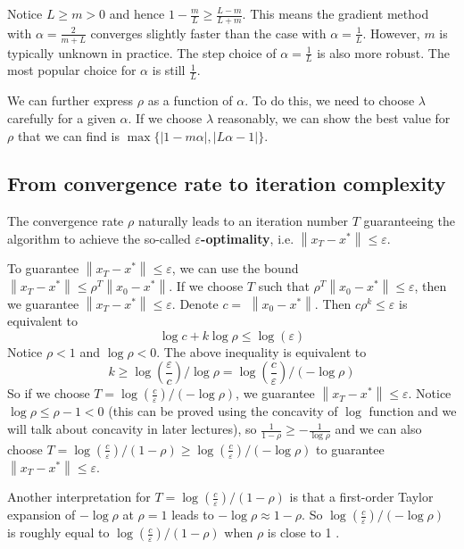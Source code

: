 \documentclass[11pt,a4paper]{article}
\begin{document}
Notice $L \geq m>0$ and hence $1-\frac{m}{L} \geq \frac{L-m}{L+m}$. This means the gradient method with $\alpha=\frac{2}{m+L}$ converges slightly faster than the case with $\alpha=\frac{1}{L}$. However, $m$ is typically unknown in practice. The step choice of $\alpha=\frac{1}{L}$ is also more robust. The most popular choice for $\alpha$ is still $\frac{1}{L}$.

We can further express $\rho$ as a function of $\alpha$. To do this, we need to choose $\lambda$ carefully for a given $\alpha$. If we choose $\lambda$ reasonably, we can show the best value for $\rho$ that we can find is $\max \{|1-m \alpha|,|L \alpha-1|\}$.


\subsection{From convergence rate to iteration complexity}
The convergence rate $\rho$ naturally leads to an iteration number $T$ guaranteeing the algorithm to achieve the so-called \textbf{$\varepsilon$-optimality}, i.e. $\left\|x_{T}-x^{*}\right\| \leq \varepsilon$.

To guarantee $\left\|x_{T}-x^{*}\right\| \leq \varepsilon$, we can use the bound $\left\|x_{T}-x^{*}\right\| \leq \rho^{T}\left\|x_{0}-x^{*}\right\| .$ If we choose $T$ such that $\rho^{T}\left\|x_{0}-x^{*}\right\| \leq \varepsilon$, then we guarantee $\left\|x_{T}-x^{*}\right\| \leq \varepsilon .$ Denote $c=$ $\left\|x_{0}-x^{*}\right\| .$ Then $c \rho^{k} \leq \varepsilon$ is equivalent to
$$
\log c+k \log \rho \leq \log (\varepsilon)
$$
Notice $\rho<1$ and $\log \rho<0$. The above inequality is equivalent to
$$
k \geq \log \left(\frac{\varepsilon}{c}\right) / \log \rho=\log \left(\frac{c}{\varepsilon}\right) /(-\log \rho)
$$
So if we choose $T=\log \left(\frac{c}{\varepsilon}\right) /(-\log \rho)$, we guarantee $\left\|x_{T}-x^{*}\right\| \leq \varepsilon$.
Notice $\log \rho \leq \rho-1<0$ (this can be proved using the concavity of $\log$ function and we will talk about concavity in later lectures), so $\frac{1}{1-\rho} \geq-\frac{1}{\log \rho}$ and we can also choose $T=\log \left(\frac{c}{\varepsilon}\right) /(1-\rho) \geq \log \left(\frac{c}{\varepsilon}\right) /(-\log \rho)$ to guarantee $\left\|x_{T}-x^{*}\right\| \leq \varepsilon$.

Another interpretation for $T=\log \left(\frac{c}{\varepsilon}\right) /(1-\rho)$ is that a first-order Taylor expansion of $-\log \rho$ at $\rho=1$ leads to $-\log \rho \approx 1-\rho$. So $\log \left(\frac{c}{\varepsilon}\right) /(-\log \rho)$ is roughly equal to $\log \left(\frac{c}{\varepsilon}\right) /(1-\rho)$ when $\rho$ is close to 1 .
\end{document}
